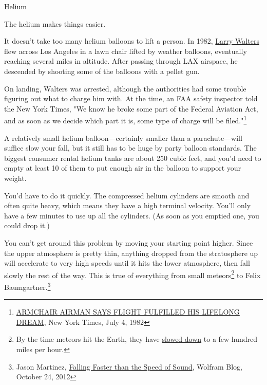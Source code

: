{{Helium}

{The helium makes things easier.}

{It doesn't take too many helium balloons to lift a person. In 1982, \href{https://en.wikipedia.org/wiki/Larry\_Walters}{Larry Walters} flew across Los Angeles in a lawn chair lifted by weather balloons, eventually reaching several miles in altitude. After passing through LAX airspace, he descended by shooting some of the balloons with a pellet gun.}

{On landing, Walters was arrested, although the authorities had some trouble figuring out what to charge him with. At the time, an FAA safety inspector told the New York Times, "We know he broke some part of the Federal Aviation Act, and as soon as we decide which part it is, some type of charge will be filed."{\footnote{ \href{http://www.nytimes.com/1982/07/04/us/armchair-airman-says-flight-fulfilled-his-lifelong-dream.html?pagewanted=all}{ARMCHAIR AIRMAN SAYS FLIGHT FULFILLED HIS LIFELONG DREAM}, New York Times, July 4, 1982} } }

{A relatively small helium balloon—certainly smaller than a parachute—will suffice slow your fall, but it still has to be huge by party balloon standards. The biggest consumer rental helium tanks are about 250 cubic feet, and you'd need to empty at least 10 of them to put enough air in the balloon to support your weight.}

{You'd have to do it quickly. The compressed helium cylinders are smooth and often quite heavy, which means they have a high terminal velocity. You'll only have a few minutes to use up all the cylinders. (As soon as you emptied one, you could drop it.)}

{You can't get around this problem by moving your starting point higher. Since the upper atmosphere is pretty thin, anything dropped from the stratosphere up will accelerate to very high speeds until it hits the lower atmosphere, then fall slowly the rest of the way. This is true of everything from small meteors{\footnote{By the time meteors hit the Earth, they have \href{http://www.geology.wisc.edu/\~museum/meteorite.html}{slowed down} to a few hundred miles per hour.} } to Felix Baumgartner.{\footnote{Jason Martinez, \href{http://blog.wolfram.com/2012/10/24/falling-faster-than-the-speed-of-sound/} {Falling Faster than the Speed of Sound}, Wolfram Blog, October 24, 2012} } }

}
